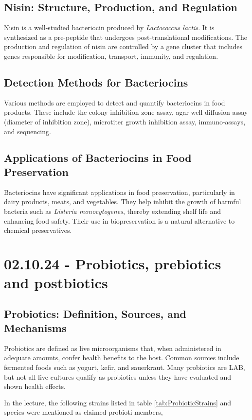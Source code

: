 \subsection{Nisin: Structure, Production, and Regulation} 
Nisin is a well-studied bacteriocin produced by \textit{Lactococcus lactis}. It is synthesized as a pre-peptide that undergoes post-translational modifications. The production and regulation of nisin are controlled by a gene cluster that includes genes responsible for modification, transport, immunity, and regulation.

\subsection{Detection Methods for Bacteriocins} 
Various methods are employed to detect and quantify bacteriocins in food products. These include the colony inhibition zone assay, agar well diffusion assay (diameter of inhibition zone), microtiter growth inhibition assay, immuno-assays, and sequencing. 

\subsection{Applications of Bacteriocins in Food Preservation} 
Bacteriocins have significant applications in food preservation, particularly in dairy products, meats, and vegetables. They help inhibit the growth of harmful bacteria such as \textit{Listeria monocytogenes}, thereby extending shelf life and enhancing food safety. Their use in biopreservation is a natural alternative to chemical preservatives.

\section{02.10.24 - Probiotics, prebiotics and postbiotics}
\subsection{Probiotics: Definition, Sources, and Mechanisms}
Probiotics are defined as live microorganisms that, when administered in adequate amounts, confer health benefits to the host. Common sources include fermented foods such as yogurt, kefir, and sauerkraut. Many probiotics are LAB, but not all live cultures qualify as probiotics unless they have evaluated and shown health effects.

In the lecture, the following strains listed in table \ref*{tab:ProbioticStrains} and species were mentioned as claimed probioti members, 

